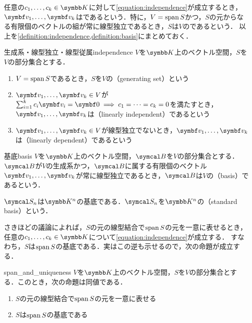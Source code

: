 \documentclass[../../main]{subfiles}
\begin{document}
任意の\(c_1,\dots,c_k\in\numset{K}\)に対して\cref{equation:independence}が成立するとき，
\(\vect{v}_1,\dots,\vect{v}_k\)はであるという．特に，\(V=\operatorname{span} S\)かつ，\(S\)の元からなる有限個のベクトルの組が常に線型独立であるとき，\(S\)は\(V\)のであるという．
以上を\cref{definition:independence,definition:basis}にまとめておく．

\begin{definition}{生成系・線型独立・線型従属}{independence}
  \(V\)を\(\numset{K}\)上のベクトル空間，\(S\)を\(V\)の部分集合とする．
  \begin{enumerate}
    \item \(V=\operatorname{span} S\)であるとき，\(S\)を\(V\)の（generating set）という
    \item \(\vect{v}_1,\dots,\vect{v}_k\in V\)が\(\sum_{i=1}^kc_i\vect{v}_i=\zvec\implies c_1=\dots=c_k=0\)を満たすとき，
      \(\vect{v}_1,\dots,\vect{v}_k\)は（linearly independent）であるという
    \item \(\vect{v}_1,\dots,\vect{v}_k\in V\)が線型独立でないとき，\(\vect{v}_1,\dots,\vect{v}_k\)は（linearly dependent）であるという
  \end{enumerate}
\end{definition}

\begin{definition}{基底}{basis}
  \(V\)を\(\numset{K}\)上のベクトル空間，\(\basis{B}\)を\(V\)の部分集合とする．
  \(\basis{B}\)が\(V\)の生成系かつ，\(\basis{B}\)に属する有限個のベクトル\(\vect{v}_1,\dots,\vect{v}_k\)が常に線型独立であるとき，\(\basis{B}\)は\(V\)の（basis）であるという．
\end{definition}

\begin{example}[標準基底]
  \(\basis{S}_n\)は\(\numset{K}^n\)の基底である．\(\basis{S}_n\)を\(\numset{K}^n\)の（standard basis）という．
\end{example}

さきほどの議論によれば，\(S\)の元の線型結合で\(\operatorname{span} S\)の元を一意に表せるとき，任意の\(c_1,\dots,c_k\in\numset{K}\)について\cref{equation:independence}が成立する．
すなわち，\(S\)は\(\operatorname{span} S\)の基底である．実はこの逆も示せるので，次の命題が成立する．

\begin{proposition}{}{span_and_uniqueness}
  \(V\)を\(\numset{K}\)上のベクトル空間，\(S\)を\(V\)の部分集合とする．このとき，次の命題は同値である．
  \begin{enumerate}
    \item \(S\)の元の線型結合で\(\operatorname{span} S\)の元を一意に表せる
    \item \(S\)は\(\operatorname{span} S\)の基底である
  \end{enumerate}
\end{proposition}
\end{document}
